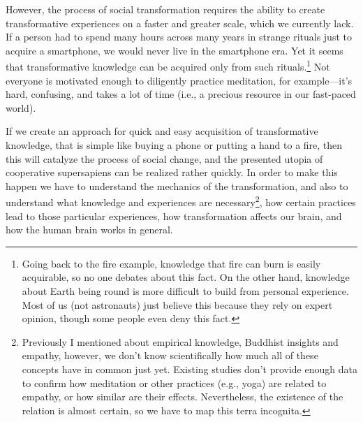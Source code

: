 \documentclass[12pt]{report}
\begin{document}
\noindent However, the process of social transformation requires the ability to create transformative experiences on a faster and greater scale, which we currently lack. If a person had to spend many hours across many years in strange rituals just to acquire a smartphone, we would never live in the smartphone era. Yet it seems that transformative knowledge can be acquired only from such rituals.\footnote{Going back to the fire example, knowledge that fire can burn is easily acquirable, so no one debates about this fact. On the other hand, knowledge about Earth being round is more difficult to build from personal experience. Most of us (not astronauts) just believe this because they rely on expert opinion, though some people even deny this fact.} Not everyone is motivated enough to diligently practice meditation, for example\thinspace---\thinspace it’s hard, confusing, and takes a lot of time (i.e., a precious resource in our fast-paced world).

\noindent If we create an approach for quick and easy acquisition of transformative knowledge, that is simple like buying a phone or putting a hand to a fire, then this will catalyze the process of social change, and the presented utopia of cooperative supersapiens can be realized rather quickly. In order to make this happen we have to understand the mechanics of the transformation, and also to understand what knowledge and experiences are necessary\footnote{Previously I mentioned about empirical knowledge, Buddhist insights and empathy, however, we don’t know scientifically how much all of these concepts have in common just yet. Existing studies don’t provide enough data to confirm how meditation or other practices (e.g., yoga) are related to empathy, or how similar are their effects. Nevertheless, the existence of the relation is almost certain, so we have to map this terra incognita.}, how certain practices lead to those particular experiences, how transformation affects our brain, and how the human brain works in general.
\end{document}
